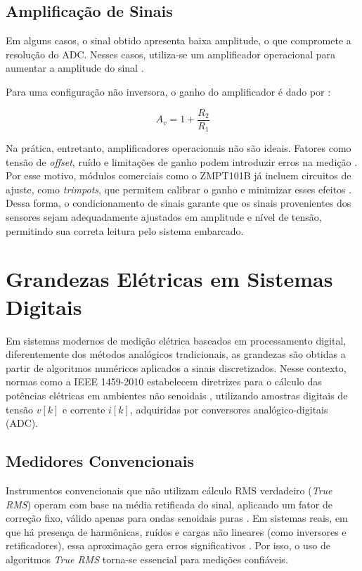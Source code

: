 \subsection{Amplificação de Sinais}
Em alguns casos, o sinal obtido apresenta baixa amplitude, o que compromete a resolução do ADC. Nesses casos, utiliza-se um amplificador operacional para aumentar a amplitude do sinal \cite{Sedra2017}.

Para uma configuração não inversora, o ganho do amplificador é dado por \cite{Sedra2017}:

\begin{equation}
    A_{v} = 1 + \frac{R_{2}}{R_{1}}
\end{equation}

Na prática, entretanto, amplificadores operacionais não são ideais. Fatores como tensão de \textit{offset}, ruído e limitações de ganho podem introduzir erros na medição \cite{Sedra2017}. Por esse motivo, módulos comerciais como o ZMPT101B já incluem circuitos de ajuste, como \textit{trimpots}, que permitem calibrar o ganho e minimizar esses efeitos \cite{DataCapture2023}. Dessa forma, o condicionamento de sinais garante que os sinais provenientes dos sensores sejam adequadamente ajustados em amplitude e nível de tensão, permitindo sua correta leitura pelo sistema embarcado.

\section{Grandezas Elétricas em Sistemas Digitais}
Em sistemas modernos de medição elétrica baseados em processamento digital, diferentemente dos métodos analógicos tradicionais, as grandezas são obtidas a partir de algoritmos numéricos aplicados a sinais discretizados. Nesse contexto, normas como a IEEE 1459-2010 estabelecem diretrizes para o cálculo das potências elétricas em ambientes não senoidais \cite{IEEE2010}, utilizando amostras digitais de tensão $v[k]$ e corrente $i[k]$, adquiridas por conversores analógico-digitais (ADC).

\subsection{Medidores Convencionais}
Instrumentos convencionais que não utilizam cálculo RMS verdadeiro (\textit{True RMS}) operam com base na média retificada do sinal, aplicando um fator de correção fixo, válido apenas para ondas senoidais puras \cite{Alexander2013, Dugan2012}. Em sistemas reais, em que há presença de harmônicas, ruídos e cargas não lineares (como inversores e retificadores), essa aproximação gera erros significativos \cite{Dugan2012, Akagi2007}. Por isso, o uso de algoritmos \textit{True RMS} torna-se essencial para medições confiáveis.

